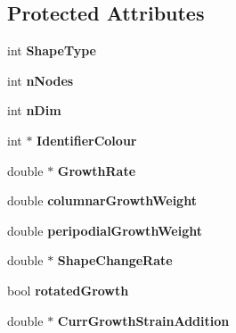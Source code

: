 \subsection*{Protected Attributes}
\begin{DoxyCompactItemize}
\item 
\hypertarget{classShapeBase_a36aedd41e8465a186a0b0c454b5b76f3}{}int {\bfseries Shape\+Type}\label{classShapeBase_a36aedd41e8465a186a0b0c454b5b76f3}

\item 
\hypertarget{classShapeBase_ae7dd93b58b3281ce90025f83d0f0e976}{}int {\bfseries n\+Nodes}\label{classShapeBase_ae7dd93b58b3281ce90025f83d0f0e976}

\item 
\hypertarget{classShapeBase_a250bd3396546342c8104f5b9c180d18f}{}int {\bfseries n\+Dim}\label{classShapeBase_a250bd3396546342c8104f5b9c180d18f}

\item 
\hypertarget{classShapeBase_a02035767d6d169d4a2c1db5f6af8a218}{}int $\ast$ {\bfseries Identifier\+Colour}\label{classShapeBase_a02035767d6d169d4a2c1db5f6af8a218}

\item 
\hypertarget{classShapeBase_ae31d7545110fd505629592348a2951b7}{}double $\ast$ {\bfseries Growth\+Rate}\label{classShapeBase_ae31d7545110fd505629592348a2951b7}

\item 
\hypertarget{classShapeBase_a134d82ba500ef829b6aa3e3a83783c9a}{}double {\bfseries columnar\+Growth\+Weight}\label{classShapeBase_a134d82ba500ef829b6aa3e3a83783c9a}

\item 
\hypertarget{classShapeBase_a3663f3220016756b1bd5a92477325ec2}{}double {\bfseries peripodial\+Growth\+Weight}\label{classShapeBase_a3663f3220016756b1bd5a92477325ec2}

\item 
\hypertarget{classShapeBase_a1c6db43b0794a15e4bc42b8ca994a785}{}double $\ast$ {\bfseries Shape\+Change\+Rate}\label{classShapeBase_a1c6db43b0794a15e4bc42b8ca994a785}

\item 
\hypertarget{classShapeBase_aee6a2cd267d49404f5442a48c867860f}{}bool {\bfseries rotated\+Growth}\label{classShapeBase_aee6a2cd267d49404f5442a48c867860f}

\item 
\hypertarget{classShapeBase_ad5b59419d3e5c4d61a14bad64f053e69}{}double $\ast$ {\bfseries Curr\+Growth\+Strain\+Addition}\label{classShapeBase_ad5b59419d3e5c4d61a14bad64f053e69}


\end{DoxyCompactItemize}
